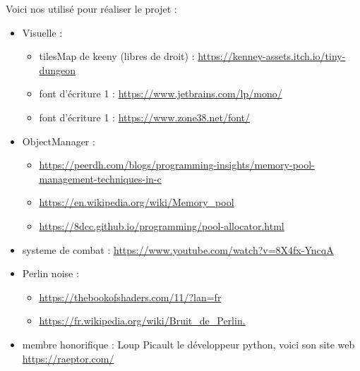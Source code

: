 \documentclass[a4paper,11pt]{article}
\begin{document}
Voici nos utilisé pour réaliser le projet : 
\begin{itemize}
    \item Visuelle : 
    \begin{itemize}
        \item tilesMap de keeny (libres de droit) : \url{https://kenney-assets.itch.io/tiny-dungeon}
        \item font d'écriture 1 : \url{https://www.jetbrains.com/lp/mono/}
        \item font d'écriture 1 : \url{https://www.zone38.net/font/}
    \end{itemize}
    \item ObjectManager : 
    \begin{itemize}
        \item \url{https://peerdh.com/blogs/programming-insights/memory-pool-management-techniques-in-c}
        \item \url{https://en.wikipedia.org/wiki/Memory_pool}
        \item \url{https://8dcc.github.io/programming/pool-allocator.html}
    \end{itemize}
    \item systeme de combat : \url{https://www.youtube.com/watch?v=8X4fx-YncqA}
    \item Perlin noise :
    \begin{itemize}
        \item \url{https://thebookofshaders.com/11/?lan=fr}
        \item \url{https://fr.wikipedia.org/wiki/Bruit_de_Perlin.}
    \end{itemize}
    \item membre honorifique : Loup Picault le développeur python, voici son site web \url{https://raeptor.com/}
    
    
\end{itemize}
\end{document}
